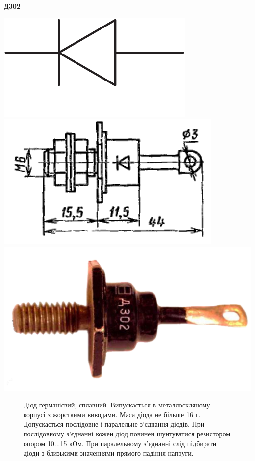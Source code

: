 \documentclass[a4paper,14pt]{extreport}
\begin{document}
\newpage
\begin{tcolorbox}[colback=white!100,colframe=red!75!black,width=19cm,righttitle=0.5cm,subtitle style={boxrule=0.4pt, colback=yellow!50!red!25!white},title= \bf{Графічне позначення}\hfill  \bf{Натуральне зоображення}]
	\begin{center}\bf{Д302}\end{center}
	\tcblower
	\includegraphics[scale=0.5]{1.1.pdf}\hfill \includegraphics[scale=0.6]{1.18.pdf} \hfill\includegraphics[scale=0.3]{1.19.pdf}
\end{tcolorbox}
\begin{figure}
\vspace{-0.7 cm}
\parbox{12cm}{%
  \begin{tcolorbox}[width=12cm,right=0.5cm]
  Діод германієвий, сплавний. Випускається в металлоскляному корпусі з жорсткими виводами. Маса діода не більше 16 г.
  Допускається послідовне і паралельне з'єднання діодів. При послідовному з'єднанні кожен діод повинен шунтуватися резистором опором 10...15 кОм. При паралельному з'єднанні слід підбирати діоди з близькими значеннями прямого падіння напруги.
  \end{tcolorbox}}
\end{figure}
\end{document}
